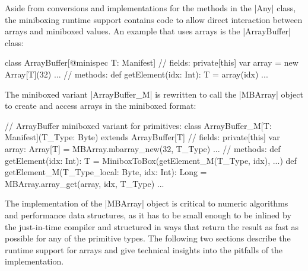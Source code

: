 Aside from conversions and implementations for the methods in the |Any| class, the miniboxing runtime support contains code to allow direct interaction between arrays and miniboxed values. An example that uses arrays is the |ArrayBuffer| class:

\begin{lstlisting-nobreak}
 class ArrayBuffer[@minispec T: Manifest] {
   // fields:
   private[this] var array = new Array[T](32)
   ...
   // methods:
   def getElement(idx: Int): T = array(idx)
   ...
 }
\end{lstlisting-nobreak}

The miniboxed variant |ArrayBuffer_M| is rewritten to call the |MBArray| object to create and access arrays in the miniboxed format:

\begin{lstlisting-nobreak}
 // ArrayBuffer miniboxed variant for primitives:
 class ArrayBuffer_M[T: Manifest](T_Type: Byte)
                               extends ArrayBuffer[T] {
   // fields:
   private[this] var array: Array[T] = MBArray.mbarray_new(32, T_Type)
   ...
   // methods:
   def getElement(idx: Int): T =
       MiniboxToBox(getElement_M(T_Type, idx), ...)
   def getElement_M(T_Type_local: Byte, idx: Int): Long =
       MBArray.array_get(array, idx, T_Type)
   ...
 }
\end{lstlisting-nobreak}

The implementation of the |MBArray| object is critical to numeric algorithms and performance data structures, as it has to be small enough to be inlined by the just-in-time compiler and structured in ways that return the result as fast as possible for any of the primitive types. The following two sections describe the runtime support for arrays and give technical insights into the pitfalls of the implementation.